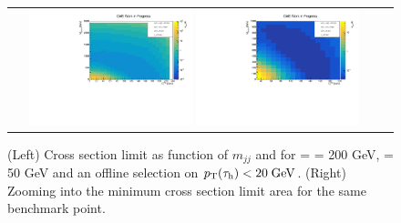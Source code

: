 \begin{figure}[tbh!]
	\centering
	\begin{tabular}{cc}
		\includegraphics[width=0.45\textwidth]{analysis/pics/JetInvMass_vs_MET_xsec_chi200_lsp050_taupt20.pdf}
		\includegraphics[width=0.45\textwidth]{analysis/pics/JetInvMass_vs_MET_xsec_chi200_lsp050_taupt20_zoom.pdf} 		
	\end{tabular}
	\caption{(Left) Cross section limit as function of $m_{jj}$ and \met for \charginopm = \neutralinotwo = 200 GeV, \neutralinoone = 50 GeV and an offline selection on $p_{\text{T}}(\tau_{\text{h}}) <  20\;\text{Ge}\kern-0.06667em\text{V}$. (Right) Zooming into the minimum cross section limit area for the same benchmark point.}
	\label{fig::JetInvMass_vs_MET_xsec_chi200_lsp050_taupt20}
\end{figure}

